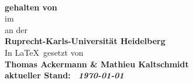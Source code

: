 \begin{titlepage}
	\begin{center}
		\makeatletter
		
		\thispagestyle{empty}
		
		\Huge\textbf{\@title} \\
		\vspace{5mm}
		\Large\textbf{ gehalten von \@author} \\
		\large{im \@date} \\
		\vspace{5mm}
		\large{an der} \\
		\Large\textbf{Ruprecht-Karls-Universität Heidelberg} \\
		\vfill
		\Large
		In \LaTeX \ gesetzt von \\ 
		\vspace{3mm}
		\bfseries{
		Thomas Ackermann
		\& 
		Mathieu Kaltschmidt}\\ 	
	   \vspace{2cm}
	   \normalfont
	   aktueller Stand: \  \textit{\today}
		\makeatother
	\end{center}
\blankpage
\end{titlepage}
